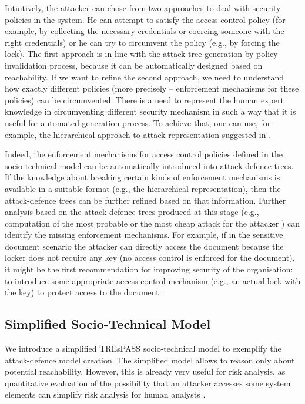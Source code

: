 \documentclass{llncs}
\begin{document}
Intuitively, the attacker can chose from two approaches to deal with security policies in the system. He can attempt to satisfy the access control policy (for example, by collecting the necessary credentials or coercing someone with the right credentials) or he can try to circumvent the policy (e.g., by forcing the lock). The first approach is in line with the attack tree generation by policy invalidation process, because it can be automatically designed based on reachability. If we want to refine the second approach, we need to understand how exactly different policies (more precisely -- enforcement mechanisms for these policies) can be circumvented. There is a need to represent the human expert knowledge in circumventing different security mechanism in such a way that it is useful for automated generation process. To achieve that, one can use, for example, the hierarchical approach to attack representation suggested in \cite{Pinchinat-WFMDS-2014}.

  
Indeed, the enforcement mechanisms for access control policies defined in the socio-technical model can be automatically introduced into attack-defence trees. If the knowledge about breaking certain kinds of enforcement mechanisms is available in a suitable format (e.g., the hierarchical representation), then the attack-defence trees can be further refined based on that information. Further analysis based on the attack-defence trees produced at this stage (e.g., computation of the most probable or the most cheap attack for the attacker \cite{Bagnato-IJSSE-2012}) can identify the missing enforcement mechanisms. For example, if in the sensitive document scenario the attacker can directly access the document because the locker does not require any key (no access control is enforced for the document), it might be the first recommendation for improving security of the organisation: to introduce some appropriate access control mechanism (e.g., an actual lock with the key) to protect access to the document.


\subsection{Simplified Socio-Technical Model}
We introduce a simplified TREsPASS socio-technical model to exemplify the attack-defence model creation. The simplified model allows to reason only about potential reachability. However, this is already very useful for risk analysis, as quantitative evaluation of the possibility that an attacker accesses some system elements can simplify risk analysis for human analysts \cite{Othmane-CS-2015}.
\end{document}
